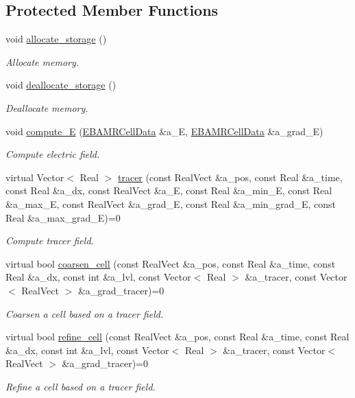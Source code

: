 \subsection*{Protected Member Functions}
\begin{DoxyCompactItemize}
\item 
void \hyperlink{classultralw__tagger_a02e5799e731a8f70f850ce6f8edcd4c7}{allocate\+\_\+storage} ()
\begin{DoxyCompactList}\small\item\em Allocate memory. \end{DoxyCompactList}\item 
void \hyperlink{classultralw__tagger_ac5d862d05081de45291c2c26889d2d69}{deallocate\+\_\+storage} ()
\begin{DoxyCompactList}\small\item\em Deallocate memory. \end{DoxyCompactList}\item 
void \hyperlink{classultralw__tagger_a25955e67cc69befa0a946a747ee7008c}{compute\+\_\+E} (\hyperlink{type__definitions_8H_a7e610f301989e5e07781c5e338bdb7c3}{E\+B\+A\+M\+R\+Cell\+Data} \&a\+\_\+E, \hyperlink{type__definitions_8H_a7e610f301989e5e07781c5e338bdb7c3}{E\+B\+A\+M\+R\+Cell\+Data} \&a\+\_\+grad\+\_\+E)
\begin{DoxyCompactList}\small\item\em Compute electric field. \end{DoxyCompactList}\item 
virtual Vector$<$ Real $>$ \hyperlink{classultralw__tagger_a86b0554ce21cd8a1be6ed08d4a6d1132}{tracer} (const Real\+Vect \&a\+\_\+pos, const Real \&a\+\_\+time, const Real \&a\+\_\+dx, const Real\+Vect \&a\+\_\+E, const Real \&a\+\_\+min\+\_\+E, const Real \&a\+\_\+max\+\_\+E, const Real\+Vect \&a\+\_\+grad\+\_\+E, const Real \&a\+\_\+min\+\_\+grad\+\_\+E, const Real \&a\+\_\+max\+\_\+grad\+\_\+E)=0
\begin{DoxyCompactList}\small\item\em Compute tracer field. \end{DoxyCompactList}\item 
virtual bool \hyperlink{classultralw__tagger_a8b1c65a9b152a34432d4a21f0ec0cfb9}{coarsen\+\_\+cell} (const Real\+Vect \&a\+\_\+pos, const Real \&a\+\_\+time, const Real \&a\+\_\+dx, const int \&a\+\_\+lvl, const Vector$<$ Real $>$ \&a\+\_\+tracer, const Vector$<$ Real\+Vect $>$ \&a\+\_\+grad\+\_\+tracer)=0
\begin{DoxyCompactList}\small\item\em Coarsen a cell based on a tracer field. \end{DoxyCompactList}\item 
virtual bool \hyperlink{classultralw__tagger_aad21e13154dcd792f68543a2eced5d4c}{refine\+\_\+cell} (const Real\+Vect \&a\+\_\+pos, const Real \&a\+\_\+time, const Real \&a\+\_\+dx, const int \&a\+\_\+lvl, const Vector$<$ Real $>$ \&a\+\_\+tracer, const Vector$<$ Real\+Vect $>$ \&a\+\_\+grad\+\_\+tracer)=0
\begin{DoxyCompactList}\small\item\em Refine a cell based on a tracer field. \end{DoxyCompactList}\end{DoxyCompactItemize}
